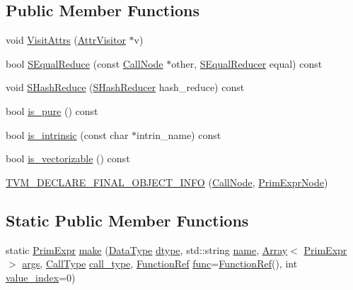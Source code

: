 \subsection*{Public Member Functions}
\begin{DoxyCompactItemize}
\item 
void \hyperlink{classtvm_1_1tir_1_1CallNode_ab16f6a3e97ab7e8ec0d2e906fd5a2f71}{Visit\+Attrs} (\hyperlink{classtvm_1_1AttrVisitor}{Attr\+Visitor} $\ast$v)
\item 
bool \hyperlink{classtvm_1_1tir_1_1CallNode_a4e631c0b21801e30d92d23a1c3de23bc}{S\+Equal\+Reduce} (const \hyperlink{classtvm_1_1tir_1_1CallNode}{Call\+Node} $\ast$other, \hyperlink{classtvm_1_1SEqualReducer}{S\+Equal\+Reducer} equal) const 
\item 
void \hyperlink{classtvm_1_1tir_1_1CallNode_a0e9eb68c0dc275f789e4794b582ad13f}{S\+Hash\+Reduce} (\hyperlink{classtvm_1_1SHashReducer}{S\+Hash\+Reducer} hash\+\_\+reduce) const 
\item 
bool \hyperlink{classtvm_1_1tir_1_1CallNode_a2399dd87487b9bbbd6f56cdfd88b15a7}{is\+\_\+pure} () const 
\item 
bool \hyperlink{classtvm_1_1tir_1_1CallNode_ab3854cf20af3de0b892f2255ee734239}{is\+\_\+intrinsic} (const char $\ast$intrin\+\_\+name) const 
\item 
bool \hyperlink{classtvm_1_1tir_1_1CallNode_ac99b7e0c7a43bbc8ba9fbc341ec91f99}{is\+\_\+vectorizable} () const 
\item 
\hyperlink{classtvm_1_1tir_1_1CallNode_a7fc7aec73f8c704f165d3026fa732e07}{T\+V\+M\+\_\+\+D\+E\+C\+L\+A\+R\+E\+\_\+\+F\+I\+N\+A\+L\+\_\+\+O\+B\+J\+E\+C\+T\+\_\+\+I\+N\+FO} (\hyperlink{classtvm_1_1tir_1_1CallNode}{Call\+Node}, \hyperlink{classtvm_1_1PrimExprNode}{Prim\+Expr\+Node})
\end{DoxyCompactItemize}
\subsection*{Static Public Member Functions}
\begin{DoxyCompactItemize}
\item 
static \hyperlink{classtvm_1_1PrimExpr}{Prim\+Expr} \hyperlink{classtvm_1_1tir_1_1CallNode_ab08f0f3e992f1adea539deac89f63ada}{make} (\hyperlink{namespacetvm_a41918af1a1dc386388639a9d3ad06c5d}{Data\+Type} \hyperlink{classtvm_1_1PrimExprNode_a95af9234514ec5f11355db41524be7f9}{dtype}, std\+::string \hyperlink{classtvm_1_1tir_1_1CallNode_a3bd9e0b7cdea76a46815d6c175f682e0}{name}, \hyperlink{classtvm_1_1Array}{Array}$<$ \hyperlink{classtvm_1_1PrimExpr}{Prim\+Expr} $>$ \hyperlink{classtvm_1_1tir_1_1CallNode_a7ca077747fdb2bcb63ca1cac4a49017f}{args}, \hyperlink{classtvm_1_1tir_1_1CallNode_a13e1f0f48f488fd085ca2684738fa97a}{Call\+Type} \hyperlink{classtvm_1_1tir_1_1CallNode_aa0fadf83d2540a578ffbc6a673a94fb5}{call\+\_\+type}, \hyperlink{classtvm_1_1tir_1_1FunctionRef}{Function\+Ref} \hyperlink{classtvm_1_1tir_1_1CallNode_afbdbda11e2bc1c47c3bcbaed9a9983e4}{func}=\hyperlink{classtvm_1_1tir_1_1FunctionRef}{Function\+Ref}(), int \hyperlink{classtvm_1_1tir_1_1CallNode_a399d6e07f8a5b8a9b15b8596fb548205}{value\+\_\+index}=0)
\end{DoxyCompactItemize}
